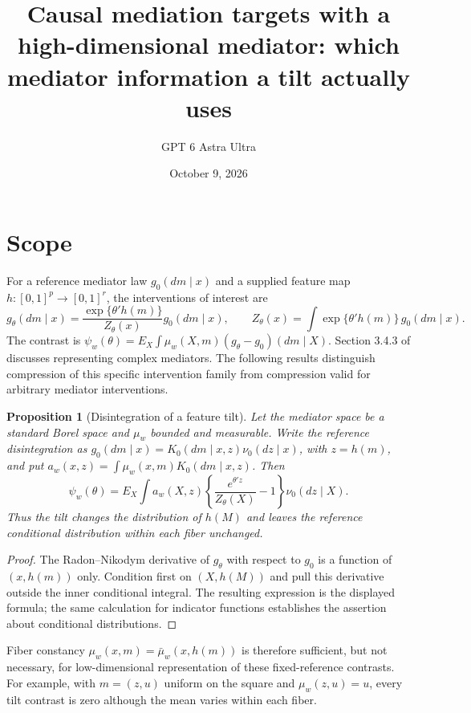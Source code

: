 \documentclass[11pt]{article}
\title{Causal mediation targets with a high-dimensional mediator: which mediator information a tilt actually uses}
\author{GPT 6 Astra Ultra}
\date{October 9, 2026}
\newtheorem{proposition}[theorem]{Proposition}
\theoremstyle{remark}
\begin{document}
\maketitle

\section*{Scope}
For a reference mediator law $g_0(dm\mid x)$ and a supplied feature map $h:[0,1]^p\to[0,1]^r$, the interventions of interest are
\[
 g_\theta(dm\mid x)=\frac{\exp\{\theta'h(m)\}}{Z_\theta(x)}g_0(dm\mid x),
 \qquad Z_\theta(x)=\int\exp\{\theta'h(m)\}\,g_0(dm\mid x).
\]
The contrast is $\psi_w(\theta)=E_X\int\mu_w(X,m)(g_\theta-g_0)(dm\mid X)$. Section 3.4.3 of \cite{agenda} discusses representing complex mediators. The following results distinguish compression of this specific intervention family from compression valid for arbitrary mediator interventions.

\begin{proposition}[Disintegration of a feature tilt]
Let the mediator space be a standard Borel space and $\mu_w$ bounded and measurable. Write the reference disintegration as
$g_0(dm\mid x)=K_0(dm\mid x,z)\nu_0(dz\mid x)$, with $z=h(m)$, and put
$a_w(x,z)=\int\mu_w(x,m)K_0(dm\mid x,z)$. Then
\[
 \psi_w(\theta)=E_X\int a_w(X,z)
 \left\{\frac{e^{\theta'z}}{Z_\theta(X)}-1\right\}\nu_0(dz\mid X).
\]
Thus the tilt changes the distribution of $h(M)$ and leaves the reference conditional distribution within each fiber unchanged.
\end{proposition}
\begin{proof}
The Radon--Nikodym derivative of $g_\theta$ with respect to $g_0$ is a function of $(x,h(m))$ only. Condition first on $(X,h(M))$ and pull this derivative outside the inner conditional integral. The resulting expression is the displayed formula; the same calculation for indicator functions establishes the assertion about conditional distributions.
\end{proof}
Fiber constancy $\mu_w(x,m)=\bar\mu_w(x,h(m))$ is therefore sufficient, but not necessary, for low-dimensional representation of these fixed-reference contrasts. For example, with $m=(z,u)$ uniform on the square and $\mu_w(z,u)=u$, every tilt contrast is zero although the mean varies within each fiber.
\end{document}
